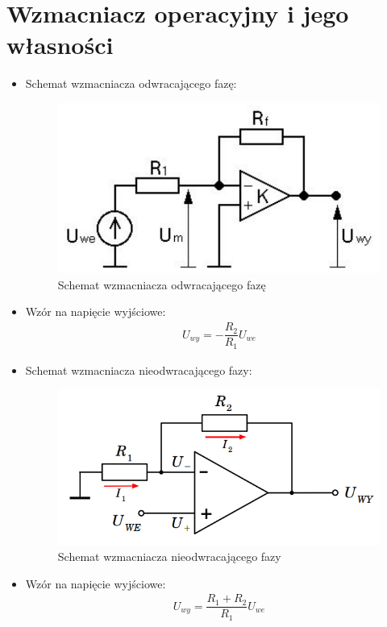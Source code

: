 \section{Wzmacniacz operacyjny i jego własności}
\label{sec:Wzmacniacz operacyjny}

\begin{itemize}
    \item Schemat wzmacniacza odwracającego fazę:
        \begin{figure}[H]
            \centering
            \includegraphics[scale=0.4]{img/schemes/wzmacniacz_operacyjny.png}
            \caption{Schemat wzmacniacza odwracającego fazę}
            \label{fig:schemat_wzmacniacz_odwracający}
        \end{figure}
    \item Wzór na napięcie wyjściowe:
        \begin{gather}
            \label{wzor:napiecie_wyjsciowe_odwracajacy}
            U_{wy} = -\dfrac{R_2}{R_1}U_{we}
        \end{gather}
    \item Schemat wzmacniacza nieodwracającego fazy:
        \begin{figure}[H]
            \centering
            \includegraphics[scale=0.4]{img/schemes/wzmacniacz_operacyjny_nieodwracajacy.png}
            \caption{Schemat wzmacniacza nieodwracającego fazy}
            \label{fig:schemat_wzmacniacz_nieodwracający}
        \end{figure}
    \item Wzór na napięcie wyjściowe:
        \begin{gather}
            \label{wzor:napiecie_wyjsciowe_nieodwracajacy}
            U_{wy} = \dfrac{R_1 + R_2}{R_1}U_{we}
        \end{gather}
        

\end{itemize}
